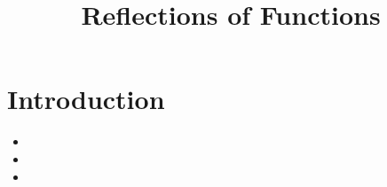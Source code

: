 \documentclass{ximera}
\author{}
\title{Reflections of Functions}
\begin{document}
\begin{abstract}
  
\end{abstract}
\maketitle



\begin{motivatingQuestions}
\item 
\item 
\item 
\end{motivatingQuestions}



\section{Introduction}






\begin{summary}\begin{itemize}
\item 
\item 
\item
\end{itemize}\end{summary}
\end{document}
